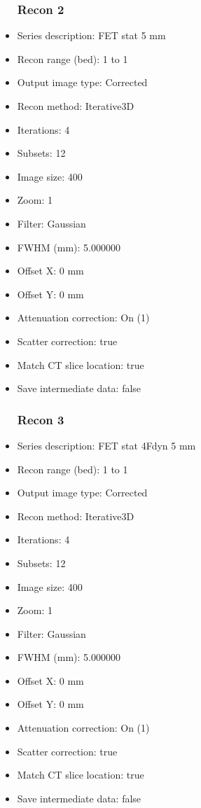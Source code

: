 \documentclass[12pt]{article}
\begin{document}
\begin{itemize}
\subsubsection{Recon 2}
\item Series description: FET stat 5 mm
\item Recon range (bed): 1 to 1
\item Output image type: Corrected
\item Recon method: Iterative3D
\item Iterations: 4
\item Subsets: 12
\item Image size: 400
\item Zoom: 1
\item Filter: Gaussian
\item FWHM (mm): 5.000000
\item Offset X: 0 mm
\item Offset Y: 0 mm
\item Attenuation correction: On (1)
\item Scatter correction: true
\item Match CT slice location: true
\item Save intermediate data: false
\subsubsection{Recon 3}
\item Series description: FET stat 4Fdyn 5 mm
\item Recon range (bed): 1 to 1
\item Output image type: Corrected
\item Recon method: Iterative3D
\item Iterations: 4
\item Subsets: 12
\item Image size: 400
\item Zoom: 1
\item Filter: Gaussian
\item FWHM (mm): 5.000000
\item Offset X: 0 mm
\item Offset Y: 0 mm
\item Attenuation correction: On (1)
\item Scatter correction: true
\item Match CT slice location: true
\item Save intermediate data: false

\end{itemize}
\end{document}
